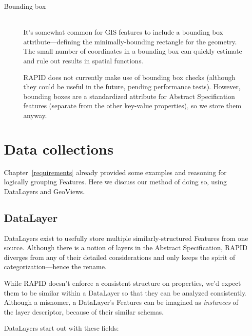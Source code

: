 \begin{description}
\item[Bounding box] \hfill \\
  It's somewhat common for GIS features to include a bounding box attribute---defining the minimally-bounding rectangle for the geometry. The small number of coordinates in a bounding box can quickly estimate and rule out results in spatial functions.

  RAPID does not currently make use of bounding box checks (although they could be useful in the future, pending performance tests). However, bounding boxes are a standardized attribute for Abstract Specification features (separate from the other key-value properties), so we store them anyway.
  
\end{description}

\section{Data collections}
Chapter~\ref{requirements} already provided some examples and reasoning for logically grouping Features. Here we discuss our method of doing so, using DataLayers and GeoViews.

\subsection{DataLayer}
DataLayers exist to usefully store multiple similarly-structured Features from one source. Although there is a notion of layers in the Abstract Specification, RAPID diverges from any of their detailed considerations and only keeps the spirit of categorization---hence the rename.

While RAPID doesn't enforce a consistent structure on properties, we'd expect them to be similar within a DataLayer so that they can be analyzed consistently. Although a misnomer, a DataLayer's Features can be imagined as \textit{instances} of the layer descriptor, because of their similar schemas.

DataLayers start out with these fields:

